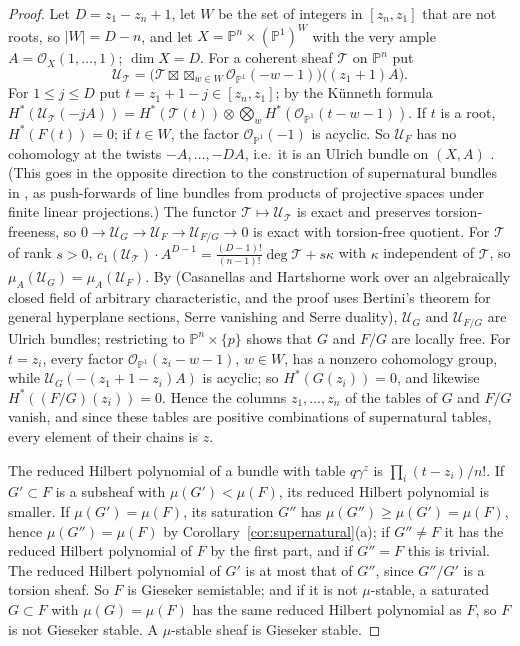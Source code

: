 \documentclass[11pt]{amsart}
\theoremstyle{definition}
\theoremstyle{remark}
\newcommand{\PP}{\mathbb{P}}
\newcommand{\OO}{\mathcal{O}}
\newcommand{\cU}{\mathcal{U}}
\newcommand{\cT}{\mathcal{T}}
\begin{document}
\begin{proof}
Let $D=z_1-z_n+1$, let $W$ be the set of integers in $[z_n,z_1]$ that are not roots, so $|W|=D-n$, and let $X=\PP^n\times(\PP^1)^W$ with the very ample $A=\OO_X(1,\dots,1)$; $\dim X=D$. For a coherent sheaf $\cT$ on $\PP^n$ put
\[
\cU_\cT=\Big(\cT\boxtimes\mathop{\boxtimes}_{w\in W}\OO_{\PP^1}(-w-1)\Big)\big((z_1+1)A\big).
\]
For $1\le j\le D$ put $t=z_1+1-j\in[z_n,z_1]$; by the Künneth formula $H^*(\cU_\cT(-jA))=H^*(\cT(t))\otimes\bigotimes_{w}H^*(\OO_{\PP^1}(t-w-1))$. If $t$ is a root, $H^*(F(t))=0$; if $t\in W$, the factor $\OO_{\PP^1}(-1)$ is acyclic. So $\cU_F$ has no cohomology at the twists $-A,\dots,-DA$, i.e.\ it is an Ulrich bundle on $(X,A)$ \cite[Prop.~2.1]{ESW03}. (This goes in the opposite direction to the construction of supernatural bundles in \cite[\S6]{ES09}, as push-forwards of line bundles from products of projective spaces under finite linear projections.) The functor $\cT\mapsto\cU_\cT$ is exact and preserves torsion-freeness, so $0\to\cU_G\to\cU_F\to\cU_{F/G}\to0$ is exact with torsion-free quotient. For $\cT$ of rank $s>0$, $c_1(\cU_\cT)\cdot A^{D-1}=\frac{(D-1)!}{(n-1)!}\deg\cT+s\kappa$ with $\kappa$ independent of $\cT$, so $\mu_A(\cU_G)=\mu_A(\cU_F)$. By \cite[Thm.~2.9(b)]{CH12} (Casanellas and Hartshorne work over an algebraically closed field of arbitrary characteristic, and the proof uses Bertini's theorem for general hyperplane sections, Serre vanishing and Serre duality), $\cU_G$ and $\cU_{F/G}$ are Ulrich bundles; restricting to $\PP^n\times\{p\}$ shows that $G$ and $F/G$ are locally free. For $t=z_i$, every factor $\OO_{\PP^1}(z_i-w-1)$, $w\in W$, has a nonzero cohomology group, while $\cU_G(-(z_1+1-z_i)A)$ is acyclic; so $H^*(G(z_i))=0$, and likewise $H^*((F/G)(z_i))=0$. Hence the columns $z_1,\dots,z_n$ of the tables of $G$ and $F/G$ vanish, and since these tables are positive combinations of supernatural tables, every element of their chains is $z$.

The reduced Hilbert polynomial of a bundle with table $q\gamma^z$ is $\prod_i(t-z_i)/n!$. If $G'\subset F$ is a subsheaf with $\mu(G')<\mu(F)$, its reduced Hilbert polynomial is smaller. If $\mu(G')=\mu(F)$, its saturation $G''$ has $\mu(G'')\ge\mu(G')=\mu(F)$, hence $\mu(G'')=\mu(F)$ by Corollary~\ref{cor:supernatural}(a); if $G''\ne F$ it has the reduced Hilbert polynomial of $F$ by the first part, and if $G''=F$ this is trivial. The reduced Hilbert polynomial of $G'$ is at most that of $G''$, since $G''/G'$ is a torsion sheaf. So $F$ is Gieseker semistable; and if it is not $\mu$-stable, a saturated $G\subset F$ with $\mu(G)=\mu(F)$ has the same reduced Hilbert polynomial as $F$, so $F$ is not Gieseker stable. A $\mu$-stable sheaf is Gieseker stable.
\end{proof}
\end{document}
